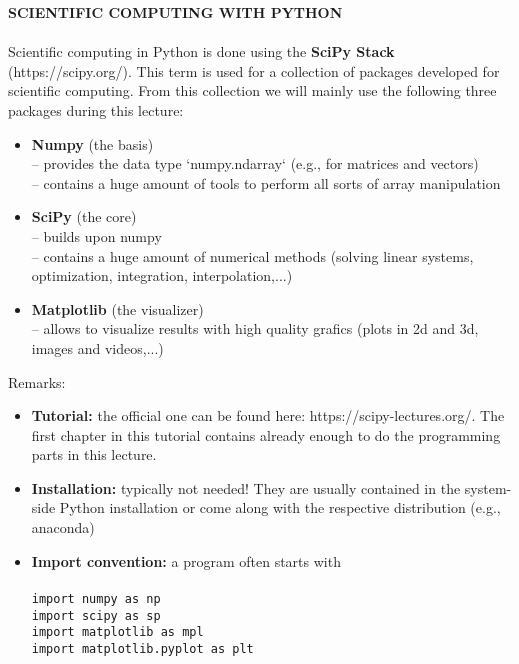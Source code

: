 {\color{navy}
\textbf{SCIENTIFIC COMPUTING WITH PYTHON}\\~\\
%
Scientific computing in Python is done using the \textbf{SciPy Stack} (https://scipy.org/). This term is used for a collection of packages developed for scientific computing. From this collection we will mainly use the following three packages during this lecture:
\begin{itemize}
\item \textbf{Numpy} (the basis)\\
    -- provides the data type `numpy.ndarray` (e.g., for matrices and vectors)\\
    -- contains a huge amount of tools to perform all sorts of array manipulation\\
%    
%
\item \textbf{SciPy} (the core)\\
    -- builds upon numpy\\
    -- contains a huge amount of numerical methods (solving linear systems, optimization, integration, interpolation,...)\\
\item \textbf{Matplotlib} (the visualizer)\\
    -- allows to visualize results with high quality grafics (plots in 2d and 3d, images and videos,...)  \\
%
\end{itemize}
%
%
Remarks:
\begin{itemize}
 \item \textbf{Tutorial:} the official one can be found here: https://scipy-lectures.org/. The first chapter in this tutorial contains already enough to do the programming parts in this lecture. 
% 
 \item \textbf{Installation:} typically not needed! They are usually contained in the system-side Python installation or come along with the respective distribution (e.g., anaconda)
%
 \item \textbf{Import convention:} a program often starts with\\~\\
%
\verb|import numpy as np|\\
\verb|import scipy as sp| \\
\verb|import matplotlib as mpl|\\
\verb|import matplotlib.pyplot as plt|\\
\end{itemize}
}
